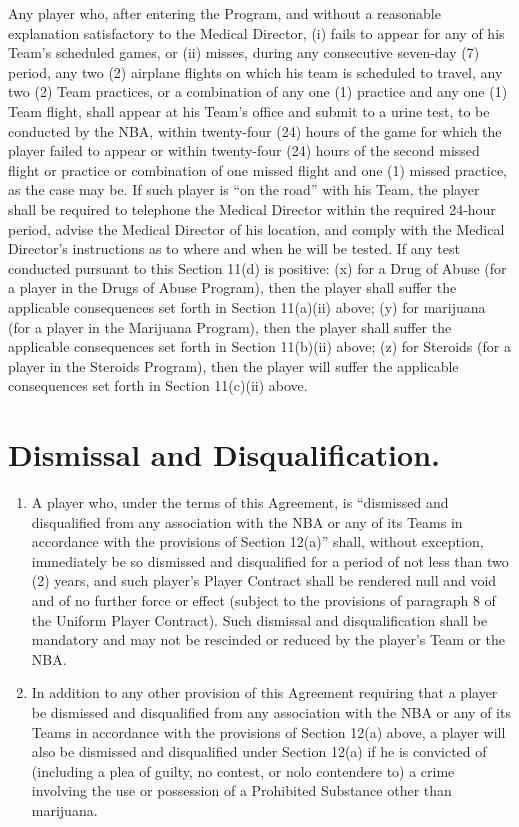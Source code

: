 \documentclass[
]{book}
\providecommand{\tightlist}{%
  \setlength{\itemsep}{0pt}\setlength{\parskip}{0pt}}
\begin{document}
\begin{enumerate}
  Any player who, after entering the Program, and without a reasonable explanation satisfactory to the Medical Director, (i) fails to appear for any of his Team's scheduled games, or (ii) misses, during any consecutive seven-day (7) period, any two (2) airplane flights on which his team is scheduled to travel, any two (2) Team practices, or a combination of any one (1) practice and any one (1) Team flight, shall appear at his Team's office and submit to a urine test, to be conducted by the NBA, within twenty-four (24) hours of the game for which the player failed to appear or within twenty-four (24) hours of the second missed flight or practice or combination of one missed flight and one (1) missed practice, as the case may be. If such player is ``on the road'' with his Team, the player shall be required to telephone the Medical Director within the required 24-hour period, advise the Medical Director of his location, and comply with the Medical Director's instructions as to where and when he will be tested. If any test conducted pursuant to this Section 11(d) is positive: (x) for a Drug of Abuse (for a player in the Drugs of Abuse Program), then the player shall suffer the applicable consequences set forth in Section 11(a)(ii) above; (y) for marijuana (for a player in the Marijuana Program), then the player shall suffer the applicable consequences set forth in Section 11(b)(ii) above; (z) for Steroids (for a player in the Steroids Program), then the player will suffer the applicable consequences set forth in Section 11(c)(ii) above.
\end{enumerate}

\hypertarget{dismissal-and-disqualification.}{%
\section{Dismissal and Disqualification.}\label{dismissal-and-disqualification.}}

\begin{enumerate}
\def\labelenumi{(\alph{enumi})}
\tightlist
\item
  A player who, under the terms of this Agreement, is ``dismissed and disqualified from any association with the NBA or any of its Teams in accordance with the provisions of Section 12(a)'' shall, without exception, immediately be so dismissed and disqualified for a period of not less than two (2) years, and such player's Player Contract shall be rendered null and void and of no further force or effect (subject to the provisions of paragraph 8 of the Uniform Player Contract). Such dismissal and disqualification shall be mandatory and may not be rescinded or reduced by the player's Team or the NBA.
\item
  In addition to any other provision of this Agreement requiring that a player be dismissed and disqualified from any association with the NBA or any of its Teams in accordance with the provisions of Section 12(a) above, a player will also be dismissed and disqualified under Section 12(a) if he is convicted of (including a plea of guilty, no contest, or nolo contendere to) a crime involving the use or possession of a Prohibited Substance other than marijuana.
\end{enumerate}
\end{document}
